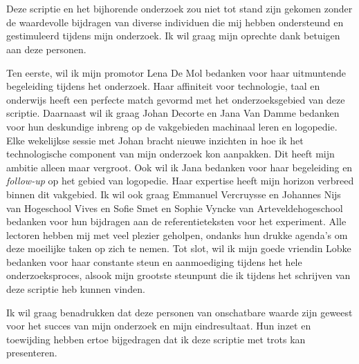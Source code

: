 
\chapter*{}%
\label{ch:voorwoord}

Deze scriptie en het bijhorende onderzoek zou niet tot stand zijn gekomen zonder de waardevolle bijdragen van diverse individuen die mij hebben ondersteund en gestimuleerd tijdens mijn onderzoek. Ik wil graag mijn oprechte dank betuigen aan deze personen.

\medspace

Ten eerste, wil ik mijn promotor Lena De Mol bedanken voor haar uitmuntende begeleiding tijdens het onderzoek. Haar affiniteit voor technologie, taal en onderwijs heeft een perfecte match gevormd met het onderzoeksgebied van deze scriptie. Daarnaast wil ik graag Johan Decorte en Jana Van Damme bedanken voor hun deskundige inbreng op de vakgebieden machinaal leren en logopedie. Elke wekelijkse sessie met Johan bracht nieuwe inzichten in hoe ik het technologische component van mijn onderzoek kon aanpakken. Dit heeft mijn ambitie alleen maar vergroot. Ook wil ik Jana bedanken voor haar begeleiding en \textit{follow-up} op het gebied van logopedie. Haar expertise heeft mijn horizon verbreed binnen dit vakgebied. Ik wil ook graag Emmanuel Vercruysse en Johannes Nijs van Hogeschool Vives en Sofie Smet en Sophie Vyncke van Arteveldehogeschool bedanken voor hun bijdragen aan de referentieteksten voor het experiment. Alle lectoren hebben mij met veel plezier geholpen, ondanks hun drukke agenda's om deze moeilijke taken op zich te nemen. Tot slot, wil ik mijn goede vriendin Lobke bedanken voor haar constante steun en aanmoediging tijdens het hele onderzoeksproces, alsook mijn grootste steunpunt die ik tijdens het schrijven van deze scriptie heb kunnen vinden.

\medspace

Ik wil graag benadrukken dat deze personen van onschatbare waarde zijn geweest voor het succes van mijn onderzoek en mijn eindresultaat. Hun inzet en toewijding hebben ertoe bijgedragen dat ik deze scriptie met trots kan presenteren.